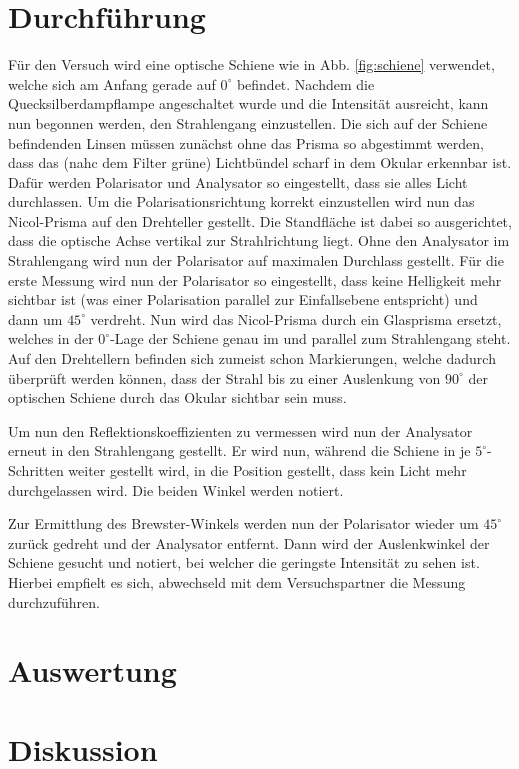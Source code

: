 \documentclass[12pt,a4paper,titlepage,headinclude,bibtotoc]{scrartcl}
\begin{document}
\section{Durchführung}
\label{sec:durchfuehrung}
Für den Versuch wird eine optische Schiene wie in Abb. \ref{fig:schiene} verwendet, welche sich am Anfang gerade auf $0^\circ $  befindet.
Nachdem die Quecksilberdampflampe angeschaltet wurde und die Intensität ausreicht, kann nun begonnen werden, den Strahlengang einzustellen.
Die sich auf der Schiene befindenden Linsen müssen zunächst ohne das Prisma so abgestimmt werden, dass das (nahc dem Filter grüne) Lichtbündel scharf in dem Okular erkennbar ist.
Dafür werden Polarisator und Analysator so eingestellt, dass sie alles Licht durchlassen.
Um die Polarisationsrichtung korrekt einzustellen wird nun das Nicol-Prisma auf den Drehteller gestellt.
Die Standfläche ist dabei so ausgerichtet, dass die optische Achse vertikal zur Strahlrichtung liegt.
Ohne den Analysator im Strahlengang wird nun der Polarisator auf maximalen Durchlass gestellt.
Für die erste Messung wird nun der Polarisator so eingestellt, dass keine Helligkeit mehr sichtbar ist (was einer Polarisation parallel zur Einfallsebene entspricht) und dann um $45^\circ$ verdreht.
Nun wird das Nicol-Prisma durch ein Glasprisma ersetzt, welches in der $0^\circ$-Lage der Schiene genau im und parallel zum Strahlengang steht.
Auf den Drehtellern befinden sich zumeist schon Markierungen, welche  dadurch überprüft werden können, dass der Strahl bis zu einer Auslenkung von $90^\circ$ der optischen Schiene durch das Okular sichtbar sein muss.

Um nun den Reflektionskoeffizienten zu vermessen wird nun der Analysator erneut in den Strahlengang gestellt.
Er wird nun, während die Schiene in je $5^\circ$-Schritten weiter gestellt wird, in die Position gestellt, dass kein Licht mehr durchgelassen wird.
Die beiden Winkel werden notiert.

Zur Ermittlung des Brewster-Winkels werden nun der Polarisator wieder um $45^\circ$ zurück gedreht und der Analysator entfernt.
Dann wird der Auslenkwinkel der Schiene gesucht und notiert, bei welcher die geringste Intensität zu sehen ist.
Hierbei empfielt es sich, abwechseld mit dem Versuchspartner die Messung durchzuführen.


\section{Auswertung}
\label{sec:auswertung}


\section{Diskussion}
\label{sec:diskussion}


 
 
\end{document}
